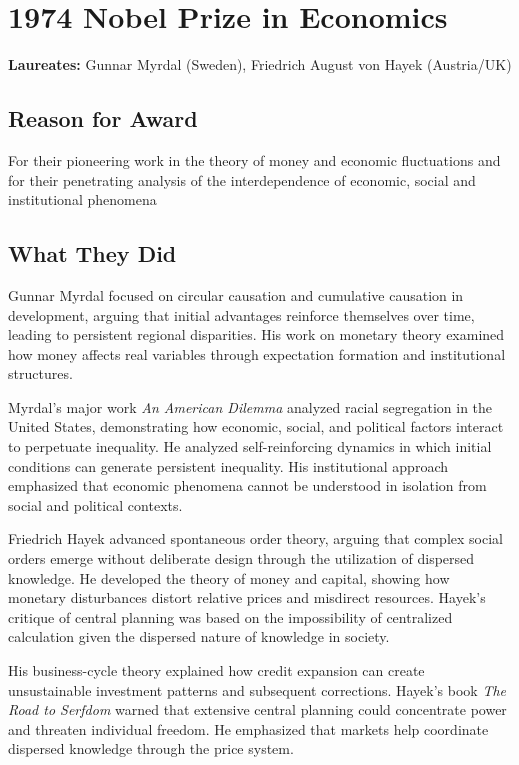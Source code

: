 \chapter{1974 Nobel Prize in Economics}
\textbf{Laureates: }Gunnar Myrdal (Sweden), Friedrich August von Hayek (Austria/UK)

\section*{Reason for Award}
For their pioneering work in the theory of money and economic fluctuations and for their
penetrating analysis of the interdependence of economic, social and institutional phenomena

\section{What They Did}
Gunnar Myrdal focused on circular causation and cumulative causation in development, arguing
that initial advantages reinforce themselves over time, leading to persistent regional disparities.
His work on monetary theory examined how money affects real variables through expectation
formation and institutional structures.

Myrdal's major work \textit{An American Dilemma} analyzed racial segregation in the United States,
demonstrating how economic, social, and political factors interact to perpetuate inequality. He
analyzed self-reinforcing dynamics in which initial conditions can generate persistent inequality.
His institutional approach emphasized that economic phenomena cannot be understood in isolation
from social and political contexts.

Friedrich Hayek advanced spontaneous order theory, arguing that complex social orders emerge
without deliberate design through the utilization of dispersed knowledge. He developed the theory
of money and capital, showing how monetary disturbances distort relative prices and misdirect
resources. Hayek's critique of central planning was based on the impossibility of centralized
calculation given the dispersed nature of knowledge in society.

His business-cycle theory explained how credit expansion can create unsustainable investment
patterns and subsequent corrections. Hayek's book \textit{The Road to Serfdom} warned that
extensive central planning could concentrate power and threaten individual freedom. He emphasized
that markets help coordinate dispersed knowledge through the price system.


